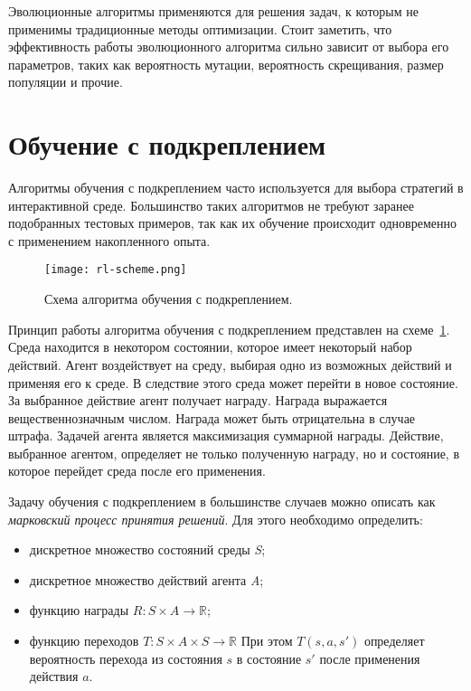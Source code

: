 Эволюционные алгоритмы применяются для решения задач, к которым не применимы традиционные методы оптимизации. Стоит заметить, что эффективность работы эволюционного алгоритма сильно зависит от выбора его параметров, таких как вероятность мутации, вероятность скрещивания, размер популяции и прочие.

\section{Обучение с подкреплением}
\label{rl}
Алгоритмы обучения с подкреплением часто используется для выбора стратегий в интерактивной среде. Большинство таких алгоритмов не требуют заранее подобранных тестовых примеров, так как их обучение происходит одновременно с применением накопленного опыта.

\begin{figure}
    \centering
    \texttt{[image: rl-scheme.png]}
    \caption{Схема алгоритма обучения с подкреплением.}
    \label{rl_scheme}
\end{figure}

Принцип работы алгоритма обучения с подкреплением представлен на схеме~\ref{rl_scheme}. Среда находится в некотором состоянии, которое имеет некоторый набор действий. Агент воздействует на среду, выбирая одно из возможных действий и применяя его к среде. В следствие этого среда может перейти в новое состояние. За выбранное действие агент получает награду. Награда выражается вещественнозначным числом. Награда может быть отрицательна в случае штрафа. Задачей агента является максимизация суммарной награды. Действие, выбранное агентом, определяет не только полученную награду, но и состояние, в которое перейдет среда после его применения.

Задачу обучения с подкреплением в большинстве случаев можно описать как \textit{марковский процесс принятия решений}. Для этого необходимо определить:

\begin{itemize}
    \item дискретное множество состояний среды \textit{S};
    \item дискретное множество действий агента \textit{A};
    \item функцию награды $R : S \times A \rightarrow \mathbb{R}$;
    \item функцию переходов $T : S \times A \times S \rightarrow \mathbb{R}$ При этом $T(s, a, s')$ определяет вероятность перехода из состояния $s$ в состояние $s'$ после применения действия $a$.
\end{itemize}

